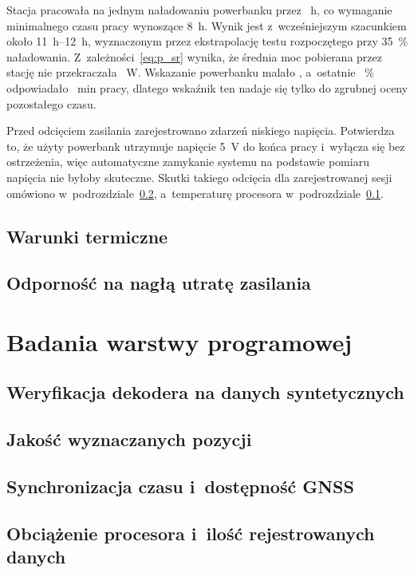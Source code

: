 Stacja pracowała na jednym naładowaniu powerbanku przez ~\si{h}, co  wymaganie minimalnego czasu pracy wynoszące \SI{8}{h}. Wynik jest  z~wcześniejszym szacunkiem około \SIrange{11}{12}{h}, wyznaczonym przez ekstrapolację testu rozpoczętego przy \SI{35}{\percent} naładowania. Z~zależności~\eqref{eq:p_sr} wynika, że średnia moc pobierana przez stację nie przekraczała ~\si{W}. Wskazanie powerbanku malało , a~ostatnie ~\si{\percent} odpowiadało ~\si{min} pracy, dlatego wskaźnik ten nadaje się tylko do zgrubnej oceny pozostałego czasu.

Przed odcięciem zasilania zarejestrowano  zdarzeń niskiego napięcia. Potwierdza to, że użyty powerbank utrzymuje napięcie \SI{5}{V} do końca pracy i~wyłącza się bez ostrzeżenia, więc automatyczne zamykanie systemu na podstawie pomiaru napięcia nie byłoby skuteczne. Skutki takiego odcięcia dla zarejestrowanej sesji omówiono w~podrozdziale~\ref{sec:utrata_zasilania}, a~temperaturę procesora w~podrozdziale~\ref{sec:termika}.

\subsection{Warunki termiczne}
\label{sec:termika}

\subsection{Odporność na nagłą utratę zasilania}
\label{sec:utrata_zasilania}

\section{Badania warstwy programowej}
\label{sec:badania_program}

\subsection{Weryfikacja dekodera na danych syntetycznych}
\label{sec:dane_syntetyczne}

\subsection{Jakość wyznaczanych pozycji}
\label{sec:jakosc_pozycji}

\subsection{Synchronizacja czasu i~dostępność GNSS}
\label{sec:czas_gnss}

\subsection{Obciążenie procesora i~ilość rejestrowanych danych}
\label{sec:obciazenie}
